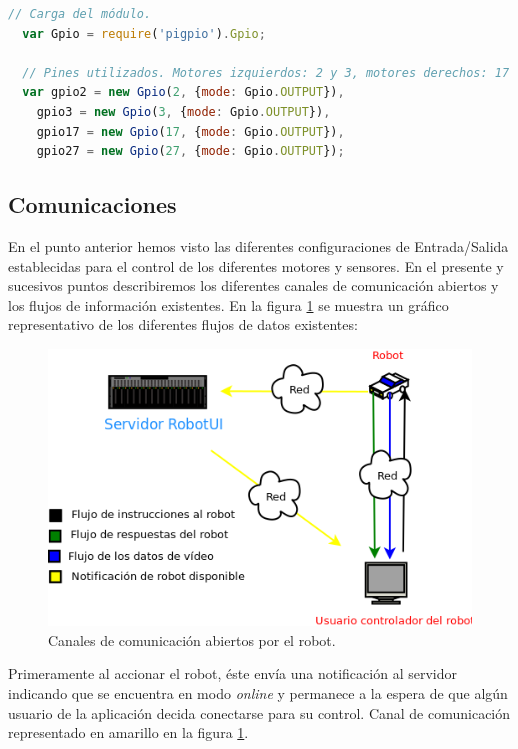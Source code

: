 \begin{lstlisting}[language=JavaScript]
  // Carga del módulo.
  var Gpio = require('pigpio').Gpio;

  // Pines utilizados. Motores izquierdos: 2 y 3, motores derechos: 17 y 27
  var gpio2 = new Gpio(2, {mode: Gpio.OUTPUT}),
    gpio3 = new Gpio(3, {mode: Gpio.OUTPUT}),
    gpio17 = new Gpio(17, {mode: Gpio.OUTPUT}),
    gpio27 = new Gpio(27, {mode: Gpio.OUTPUT});
\end{lstlisting}



\subsection{Comunicaciones}

En el punto anterior hemos visto las diferentes configuraciones de Entrada/Salida establecidas para el control de los diferentes motores y sensores. En el presente y sucesivos puntos describiremos los diferentes
canales de comunicación abiertos y los flujos de información existentes. En la figura \ref{figura:comunicaciones-robot} se muestra un gráfico representativo de los diferentes flujos de datos existentes:


\begin{figure}[H]
  \begin{center}
    \includegraphics[scale=0.6]{diagramas/flujo-comunicaciones-robot.png}
  \end{center}
  \caption{Canales de comunicación abiertos por el robot.}
  \label{figura:comunicaciones-robot}
\end{figure}


Primeramente al accionar el robot, éste envía una notificación al servidor indicando que se encuentra en modo \emph{online} y permanece a la espera de que algún usuario de la aplicación decida conectarse para su control.
Canal de comunicación representado en amarillo en la figura \ref{figura:comunicaciones-robot}.\\

